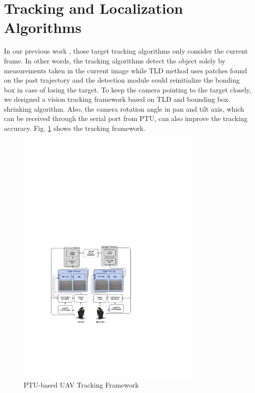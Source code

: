\section{Tracking and Localization Algorithms}
In our previous work \cite{ma2016stereo}\cite{tang2016ground}, those target tracking algorithms only consider the current frame. In other words, the tracking algorithms detect the object solely by measurements taken in the current image while TLD method uses patches found on the past trajectory and the detection module could reinitialize the bonding box in case of losing the target. To keep the camera pointing to the target closely, we designed a vision tracking framework based on TLD and bounding box shrinking algorithm. Also, the camera rotation angle in pan and tilt axis, which can be received through the serial port from PTU, can also improve the tracking accuracy. Fig. \ref{fig:sci01_tracking_framework} shows the tracking framework.

\begin{figure}[!th]
	\centering
	\includegraphics[width=0.8\textwidth]{Figs/sci01_tracking_framework2.pdf}	
	\caption{PTU-based UAV Tracking Framework}
	\label{fig:sci01_tracking_framework}
\end{figure}

